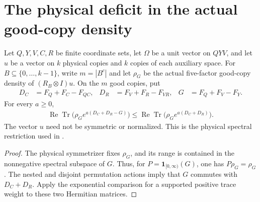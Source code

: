 \section{The physical deficit in the actual good-copy density}
\label{sec:replica_good_physical_exponential}

\begin{theorem}
\label{thm:replica_good_physical_exponential_removal}
\leanok
Let $Q,Y,V,C,R$ be finite coordinate sets, let $\Omega$ be a unit vector
on $QYV$, and let $u$ be a vector on $k$ physical copies and $k$ copies
of each auxiliary space. For $B\subseteq\{0,\ldots,k-1\}$, write
$m=|B^c|$ and let $\rho_G$ be the actual five-factor good-copy density
of $(R_B\otimes I)u$. On the $m$ good copies, put
\begin{align*}
 D_C&=F_Q+F_C-F_{QC}, &
 D_R&=F_V+F_R-F_{VR}, &
 G&=F_Q+F_V-F_Y.
\end{align*}
For every $a\geq0$,
\begin{align*}
 \operatorname{Re}\operatorname{Tr}\bigl(\rho_G e^{a(D_C+D_R-G)}\bigr)
 \leq\operatorname{Re}\operatorname{Tr}\bigl(\rho_G e^{a(D_C+D_R)}\bigr).
\end{align*}
The vector $u$ need not be symmetric or normalized. This is the
physical spectral restriction used in
\cite[Section~8, lines~501--555]{OpenAI2026AreaLaw}.
\end{theorem}
\begin{proof}
\leanok
{}
The physical symmetrizer fixes $\rho_G$, and its range is contained
in the nonnegative spectral subspace of $G$. Thus, for
$P=\mathbf1_{[0,\infty)}(G)$, one has $P\rho_G=\rho_G$.
The nested and disjoint permutation actions imply that $G$ commutes
with $D_C+D_R$. Apply the exponential comparison for a supported
positive trace weight to these two Hermitian matrices.
\end{proof}

